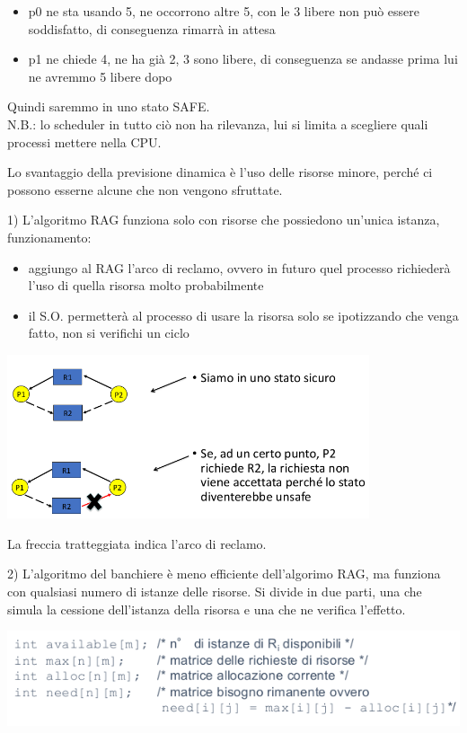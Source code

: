 \documentclass[a4paper, 12pt]{book}
\begin{document}
\begin{itemize}
    \item p0 ne sta usando 5, ne occorrono altre 5, con le 3 libere non può essere soddisfatto, di conseguenza rimarrà in attesa
    \item p1 ne chiede 4, ne ha già 2, 3 sono libere, di conseguenza se andasse prima lui ne avremmo 5 libere dopo
\end{itemize}
Quindi saremmo in uno stato SAFE.\\
N.B.: lo scheduler in tutto ciò non ha rilevanza, lui si limita a scegliere quali processi mettere nella CPU.

Lo svantaggio della
previsione dinamica è l'uso delle risorse minore, perché ci possono esserne alcune che non vengono sfruttate.

\vspace{3ex}1) L'algoritmo RAG funziona solo con risorse che possiedono un'unica istanza, funzionamento:

\begin{itemize}
    \item aggiungo al RAG l'arco di reclamo, ovvero in futuro quel processo richiederà l'uso di quella risorsa molto probabilmente
    \item il S.O. permetterà al processo di usare la risorsa solo se ipotizzando che venga fatto, non si verifichi un ciclo
\end{itemize}

\begin{center}
    \includegraphics[width=0.8\textwidth]{rag_reclamo.png}
\end{center}
La freccia tratteggiata indica l'arco di reclamo.

2) L'algoritmo del banchiere è meno efficiente dell'algorimo RAG, ma
funziona con qualsiasi numero di istanze delle risorse. Si divide in due parti, una che simula la cessione dell'istanza della risorsa
e una che ne verifica l'effetto.

\begin{center}
    \includegraphics*[width=1\textwidth]{banchiere3.png}
\end{center}
\end{document}
